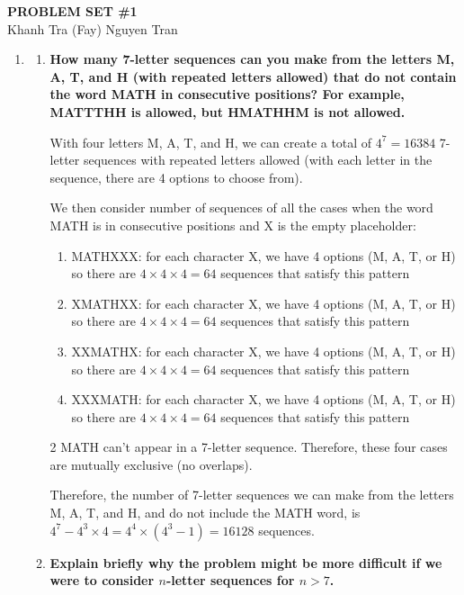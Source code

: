 \documentclass[10pt]{article}
\begin{document}
\begin{center}
\textbf{PROBLEM SET \#1}\\
Khanh Tra (Fay) Nguyen Tran
\end{center}

\begin{enumerate}


\item

\begin{enumerate}
\item
\textbf{How many 7-letter sequences can you make from the letters M, A, T, and H (with repeated letters allowed) that do not contain the word MATH in consecutive positions?  For example, MATTTHH is allowed, but H{\bf MATH}HM is not allowed.}

    With four letters M, A, T, and H, we can create a total of $4^7 =16384$ 7-letter sequences with repeated letters allowed (with each letter in the sequence, there are 4 options to choose from).

    We then consider number of sequences of all the cases when the word MATH is in consecutive positions and X is the empty placeholder:

\begin{enumerate}
    \item MATHXXX: for each character X, we have 4 options (M, A, T, or H) so there are $4 \times 4 \times 4 = 64$ sequences that satisfy this pattern
    \item XMATHXX: for each character X, we have 4 options (M, A, T, or H) so there are $4 \times 4 \times 4 = 64$ sequences that satisfy this pattern
    \item XXMATHX: for each character X, we have 4 options (M, A, T, or H) so there are $4 \times 4 \times 4 = 64$ sequences that satisfy this pattern
    \item XXXMATH: for each character X, we have 4 options (M, A, T, or H) so there are $4 \times 4 \times 4 = 64$ sequences that satisfy this pattern
\end{enumerate} 

2 MATH can't appear in a 7-letter sequence. Therefore, these four cases are mutually exclusive (no overlaps).

Therefore, the number of 7-letter sequences we can make from the letters M, A, T, and H, and do not include the MATH word, is $4^7 - 4^3 \times 4 = 4^4 \times (4^3 - 1) = 16128$ sequences.

\item
\textbf{Explain briefly why the problem might be more difficult if we were to consider $n$-letter sequences for $n>7$.}


\end{enumerate}
\end{enumerate}
\end{document}
